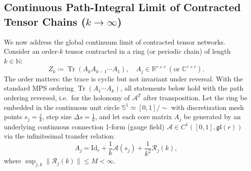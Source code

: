 \documentclass[11pt,a4paper,reqno]{amsart}
\theoremstyle{definition}
\numberwithin{equation}{section}
\providecommand{\R}{\mathbb{R}}
\newcommand{\C}{\mathbb{C}}
\newcommand{\N}{\mathbb{N}}
\providecommand{\Sph}{\mathbb{S}}
\newcommand{\Id}{\mathrm{Id}}
\newcommand{\Tr}{\operatorname{Tr}}
\providecommand{\Sph}{\mathbb{S}}
\providecommand{\R}{\mathbb{R}}
\begin{document}
\subsection{Continuous Path-Integral Limit of Contracted Tensor Chains (\texorpdfstring{$k \to \infty$}{k -> infty})}
\label{subsec:path_integral_gauge}
We now address the global continuum limit of contracted tensor networks. Consider an order-$k$ tensor contracted in a ring (or periodic chain) of length $k \in \N$:
\begin{equation}
    \label{eq:discrete_mps_trace}
    Z_k \coloneqq \Tr\left( A_k A_{k-1} \cdots A_1 \right), \quad A_j \in \R^{r \times r} \ (\text{or } \C^{r \times r}).
\end{equation}
The order matters: the trace is cyclic but not invariant under reversal. With the standard MPS ordering $\Tr(A_1 \cdots A_k)$, all statements below hold with the path ordering reversed, i.e.\ for the holonomy of $\mathcal{A}^T$ after transposition.
Let the ring be embedded in the continuous unit circle $\Sph^1 \simeq [0, 1]/\sim$ with discretization mesh points $s_j = \frac{j}{k}$, step size $\Delta s = \frac{1}{k}$, and let each core matrix $A_j$ be generated by an underlying continuous connection 1-form (gauge field) $\mathcal{A} \in C^1([0, 1], \mathfrak{gl}(r))$ via the infinitesimal transfer relation:
\begin{equation}
    \label{eq:transfer_generator}
    A_j = \Id_r + \frac{1}{k} \mathcal{A}(s_j) + \frac{1}{k^2} \mathcal{R}_j(k),
\end{equation}
where $\sup_{j, k} \|\mathcal{R}_j(k)\| \le M < \infty$.
\end{document}
